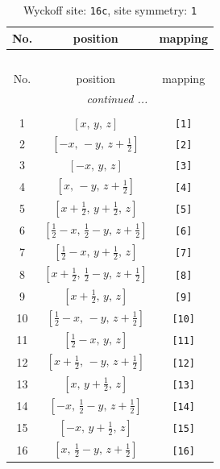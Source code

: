 \documentclass[fleqn,8pt]{jsarticle}
\begin{document}
\begin{longtable}{ccc}
\caption{Wyckoff site: {\tt 16c}, site symmetry: {\tt 1}}
 \\
 \hline \hline
No. & position & mapping \\ \hline \endfirsthead

\multicolumn{2}{l}{\tablename\ \thetable{}} \\
 \hline \hline
No. & position & mapping \\ \hline \endhead

 \hline \hline
\multicolumn{2}{r}{\footnotesize\it continued ...} \\ \endfoot

 \hline \hline
\multicolumn{2}{r}{} \\ \endlastfoot

1 & $\left[ x,\, y,\, z \right]$ & {\tt [1]} \\ \hline
2 & $\left[ - x,\, - y,\, z + \frac{1}{2} \right]$ & {\tt [2]} \\ \hline
3 & $\left[ - x,\, y,\, z \right]$ & {\tt [3]} \\ \hline
4 & $\left[ x,\, - y,\, z + \frac{1}{2} \right]$ & {\tt [4]} \\ \hline
5 & $\left[ x + \frac{1}{2},\, y + \frac{1}{2},\, z \right]$ & {\tt [5]} \\ \hline
6 & $\left[ \frac{1}{2} - x,\, \frac{1}{2} - y,\, z + \frac{1}{2} \right]$ & {\tt [6]} \\ \hline
7 & $\left[ \frac{1}{2} - x,\, y + \frac{1}{2},\, z \right]$ & {\tt [7]} \\ \hline
8 & $\left[ x + \frac{1}{2},\, \frac{1}{2} - y,\, z + \frac{1}{2} \right]$ & {\tt [8]} \\ \hline
9 & $\left[ x + \frac{1}{2},\, y,\, z \right]$ & {\tt [9]} \\ \hline
10 & $\left[ \frac{1}{2} - x,\, - y,\, z + \frac{1}{2} \right]$ & {\tt [10]} \\ \hline
11 & $\left[ \frac{1}{2} - x,\, y,\, z \right]$ & {\tt [11]} \\ \hline
12 & $\left[ x + \frac{1}{2},\, - y,\, z + \frac{1}{2} \right]$ & {\tt [12]} \\ \hline
13 & $\left[ x,\, y + \frac{1}{2},\, z \right]$ & {\tt [13]} \\ \hline
14 & $\left[ - x,\, \frac{1}{2} - y,\, z + \frac{1}{2} \right]$ & {\tt [14]} \\ \hline
15 & $\left[ - x,\, y + \frac{1}{2},\, z \right]$ & {\tt [15]} \\ \hline
16 & $\left[ x,\, \frac{1}{2} - y,\, z + \frac{1}{2} \right]$ & {\tt [16]} \\
\end{longtable}
\end{document}
